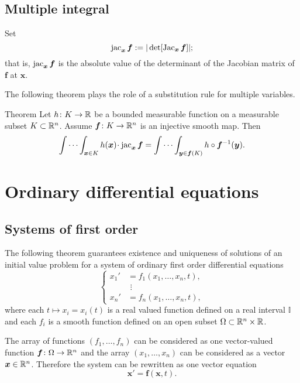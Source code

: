 \subsection*{Multiple integral}

Set 
\[\mathop{\rm jac}\nolimits_{\bm{x}}\bm{f}:=|\det[\mathop{\rm Jac}\nolimits_{\bm{x}}\bm{f}]|;\]
that is, $\mathop{\rm jac}\nolimits_{\bm{x}}\bm{f}$ is the absolute value of the determinant of the Jacobian matrix of $\bm{f}$ at $\bm{x}$.

The following theorem plays the role of a substitution rule for multiple variables.

\begin{thm}{Theorem}\label{thm:mult-substitution}
Let $h\colon K\to\mathbb{R}$ be a bounded measurable function on a measurable subset $K\subset \mathbb{R}^n$.
Assume $\bm{f}\colon K\to \mathbb{R}^n$ is an injective smooth map.
Then 
\[\idotsint_{\bm{x}\in K} h(\bm{x})\cdot \jac_{\bm{x}}\bm{f}
=
\idotsint_{\bm{y}\in \bm{f}(K)} h\circ \bm{f}^{-1}(\bm{y}).\]

\end{thm}




\section{Ordinary differential equations}

\subsection*{Systems of first order}

The following theorem guarantees existence and uniqueness of solutions of an initial value problem
for a system of ordinary first order differential equations
\[
\begin{cases}
x_1'&=f_1(x_1,\dots,x_n,t),
\\
&\,\,\vdots
\\
x_n'&=f_n(x_1,\dots,x_n,t),
\end{cases}
\]
where each $t\mapsto x_i=x_i(t)$ is a real valued function defined on a real interval $\mathbb{I}$
and each $f_i$ is a smooth function defined on an open subset $\Omega\subset \mathbb{R}^n\times \mathbb{R}$.

The array of functions $(f_1,\dots,f_n)$ can be considered as one vector-valued function 
$\bm{f}\colon\Omega\to \mathbb{R}^n$ and the array $(x_1,\dots,x_n)$ can be considered as a vector  $\bm{x}\in\mathbb{R}^n$.
Therefore the system can be rewritten as one vector equation 
\[\bm{x}'=\bm{f}(\bm{x}, t).\] 

